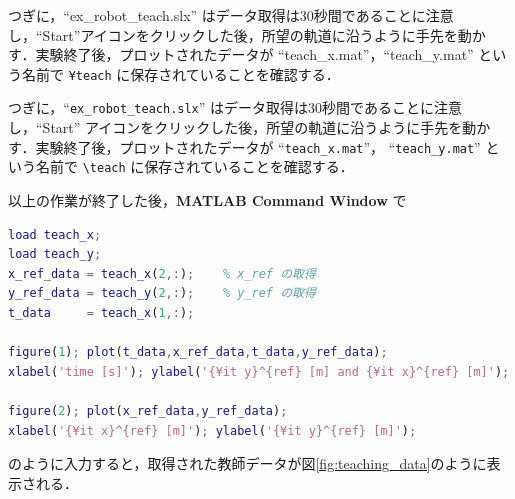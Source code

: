 つぎに，``ex\_robot\_teach.slx'' はデータ取得は30秒間であることに注意し，``Start''アイコンをクリックした後，所望の軌道に沿うように手先を動かす．実験終了後，プロットされたデータが ``teach\_x.mat''，``teach\_y.mat'' という名前で \verb|¥teach| に保存されていることを確認する．

つぎに，“\texttt{ex\_robot\_teach.slx}” はデータ取得は30秒間であることに注意し，“Start” アイコンをクリックした後，所望の軌道に沿うように手先を動かす．実験終了後，プロットされたデータが “\texttt{teach\_x.mat}”， “\texttt{teach\_y.mat}” という名前で \texttt{\textbackslash teach} に保存されていることを確認する．

以上の作業が終了した後，\textbf{MATLAB Command Window} で

\begin{lstlisting}[language=Matlab]
load teach_x;
load teach_y;
x_ref_data = teach_x(2,:);    % x_ref の取得
y_ref_data = teach_y(2,:);    % y_ref の取得
t_data     = teach_x(1,:);    

figure(1); plot(t_data,x_ref_data,t_data,y_ref_data);
xlabel('time [s]'); ylabel('{¥it y}^{ref} [m] and {¥it x}^{ref} [m]');

figure(2); plot(x_ref_data,y_ref_data);
xlabel('{¥it x}^{ref} [m]'); ylabel('{¥it y}^{ref} [m]');
\end{lstlisting}

のように入力すると，取得された教師データが図\ref{fig:teaching_data}のように表示される．

